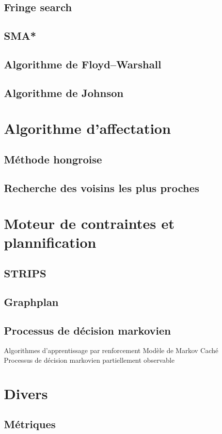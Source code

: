 \subsection{Fringe search}
\subsection{SMA*}
\subsection{Algorithme de Floyd–Warshall}
\subsection{Algorithme de Johnson}

%
\section{Algorithme d'affectation}
\subsection{Méthode hongroise}
\subsection{Recherche des voisins les plus proches}

%
\section{Moteur de contraintes et plannification}
\subsection{STRIPS}
\subsection{Graphplan}
\subsection{Processus de décision markovien}
Algorithmes d'apprentissage par renforcement
Modèle de Markov Caché
Processus de décision markovien partiellement observable

%
\section{Divers}
\subsection{Métriques}
